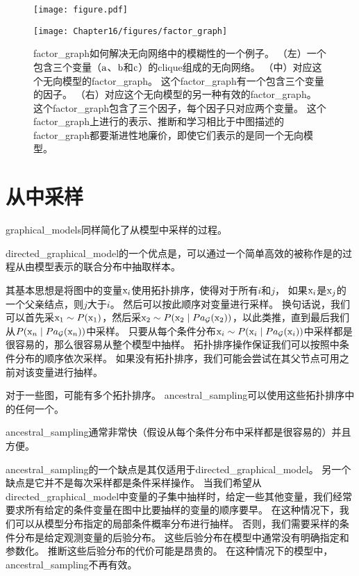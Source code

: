 \begin{figure}[!htb]
\ifOpenSource
\centerline{\texttt{[image: figure.pdf]}}
\else
	\centerline{\texttt{[image: Chapter16/figures/factor\_graph]}}	
\fi
\caption{\gls{factor_graph}如何解决无向网络中的模糊性的一个例子。
（左）一个包含三个变量（$\mathrm{a}$、$\mathrm{b}$和$\mathrm{c}$）的\gls{clique}组成的无向网络。
（中）对应这个无向模型的\gls{factor_graph}。
这个\gls{factor_graph}有一个包含三个变量的因子。
（右）对应这个无向模型的另一种有效的\gls{factor_graph}。
这个\gls{factor_graph}包含了三个因子，每个因子只对应两个变量。
这个\gls{factor_graph}上进行的表示、推断和学习相比于中图描述的\gls{factor_graph}都要渐进性地廉价，即使它们表示的是同一个无向模型。}
	\label{fig:factor_graph}
\end{figure}


\section{从中采样}
\label{sec:sampling_from_graphical_models}

\gls{graphical_models}同样简化了从模型中采样的过程。


\gls{directed_graphical_model}的一个优点是，可以通过一个简单高效的被称作是的过程从由模型表示的联合分布中抽取样本。


其基本思想是将图中的变量$\mathrm{x}_i$使用拓扑排序，使得对于所有$i$和$j$，
如果$\mathrm{x}_i$是$\mathrm{x}_j$的一个父亲结点，则$j$大于$i$。
然后可以按此顺序对变量进行采样。
换句话说，我们可以首先采$\mathrm{x}_1\sim P(\mathrm{x}_1)$，然后采$\mathrm{x}_2\sim P(\mathrm{x}_2\mid Pa_{\mathcal{G}}(\mathrm{x}_2))$，以此类推，直到最后我们从$ P(\mathrm{x}_n\mid Pa_{\mathcal{G}}(\mathrm{x}_n))$中采样。
只要从每个条件分布$\mathrm{x}_i\sim P(\mathrm{x}_i\mid Pa_{\mathcal{G}}(\mathrm{x}_i))$中采样都是很容易的，那么很容易从整个模型中抽样。
拓扑排序操作保证我们可以按照中条件分布的顺序依次采样。
如果没有拓扑排序，我们可能会尝试在其父节点可用之前对该变量进行抽样。


对于一些图，可能有多个拓扑排序。 
\gls{ancestral_sampling}可以使用这些拓扑排序中的任何一个。

\gls{ancestral_sampling}通常非常快（假设从每个条件分布中采样都是很容易的）并且方便。


\gls{ancestral_sampling}的一个缺点是其仅适用于\gls{directed_graphical_model}。 
另一个缺点是它并不是每次采样都是条件采样操作。
当我们希望从\gls{directed_graphical_model}中变量的子集中抽样时，给定一些其他变量，我们经常要求所有给定的条件变量在图中比要抽样的变量的顺序要早。
在这种情况下，我们可以从模型分布指定的局部条件概率分布进行抽样。 
否则，我们需要采样的条件分布是给定观测变量的后验分布。
这些后验分布在模型中通常没有明确指定和参数化。 
推断这些后验分布的代价可能是昂贵的。 
在这种情况下的模型中，\gls{ancestral_sampling}不再有效。



